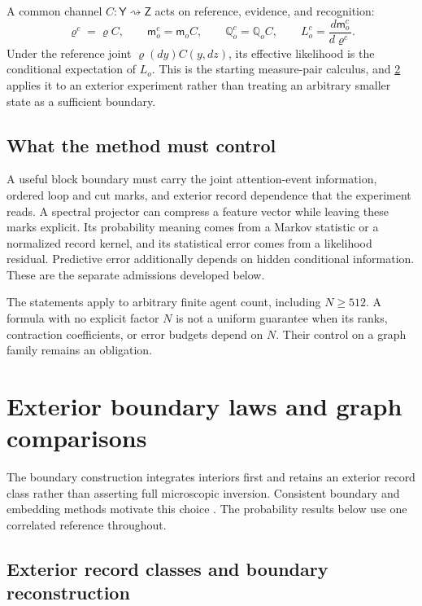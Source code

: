 \documentclass[11pt,letterpaper]{report}
\begin{document}
A common channel $C:\mathsf Y\rightsquigarrow\mathsf Z$ acts on reference, evidence, and recognition:
\begin{equation}
\varrho^c=\varrho C,\qquad
\mathsf m_o^c=\mathsf m_oC,\qquad
\mathbb Q_o^c=\mathbb Q_oC,\qquad
L_o^c=\frac{d\mathsf m_o^c}{d\varrho^c}.
\label{eq:sb-common-channel}
\end{equation}
Under the reference joint $\varrho(dy)C(y,dz)$, its effective likelihood is the conditional expectation of $L_o$. This is the starting measure-pair calculus, and \cref{ch:sb-boundary} applies it to an exterior experiment rather than treating an arbitrary smaller state as a sufficient boundary.

\section{What the method must control}
A useful block boundary must carry the joint attention-event information, ordered loop and cut marks, and exterior record dependence that the experiment reads. A spectral projector can compress a feature vector while leaving these marks explicit. Its probability meaning comes from a Markov statistic or a normalized record kernel, and its statistical error comes from a likelihood residual. Predictive error additionally depends on hidden conditional information. These are the separate admissions developed below.

The statements apply to arbitrary finite agent count, including $N\ge512$. A formula with no explicit factor $N$ is not a uniform guarantee when its ranks, contraction coefficients, or error budgets depend on $N$. Their control on a graph family remains an obligation.
\chapter{Exterior boundary laws and graph comparisons}
\label{ch:sb-boundary}
The boundary construction integrates interiors first and retains an exterior record class rather than asserting full microscopic inversion. Consistent boundary and embedding methods motivate this choice \cite[Sec.~6, Eqs.~(6.1)--(6.4), and Sec.~7]{dittrich-2012-continuum-limit-spin-foams}\cite[Sec.~3.1, Eqs.~(3.1)--(3.2), and Sec.~4, Eqs.~(4.2)--(4.3)]{dittrich-2014-time-evolution-refining-coarse-graining}. The probability results below use one correlated reference throughout.
\section{Exterior record classes and boundary reconstruction}
\label{sec:sf-boundary-records}
\end{document}
